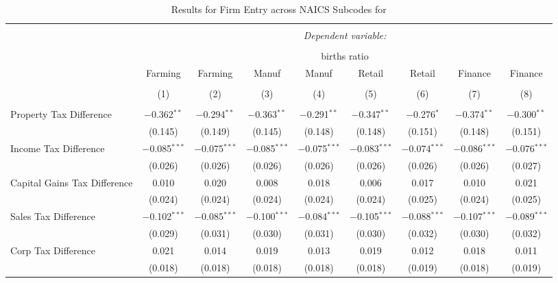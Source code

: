 
\begin{table}[!htbp] \centering 
  \caption{Results for Firm Entry across NAICS Subcodes for } 
  \label{naics} 
\small 
\begin{tabular}{@{\extracolsep{5pt}}lcccccccc} 
\\[-1.8ex]\hline 
\hline \\[-1.8ex] 
 & \multicolumn{8}{c}{\textit{Dependent variable:}} \\ 
\cline{2-9} 
\\[-1.8ex] & \multicolumn{8}{c}{births ratio} \\ 
 & Farming & Farming & Manuf & Manuf & Retail & Retail & Finance & Finance \\ 
\\[-1.8ex] & (1) & (2) & (3) & (4) & (5) & (6) & (7) & (8)\\ 
\hline \\[-1.8ex] 
 Property Tax Difference & $-$0.362$^{**}$ & $-$0.294$^{**}$ & $-$0.363$^{**}$ & $-$0.291$^{**}$ & $-$0.347$^{**}$ & $-$0.276$^{*}$ & $-$0.374$^{**}$ & $-$0.300$^{**}$ \\ 
  & (0.145) & (0.149) & (0.145) & (0.148) & (0.148) & (0.151) & (0.148) & (0.151) \\ 
  Income Tax Difference & $-$0.085$^{***}$ & $-$0.075$^{***}$ & $-$0.085$^{***}$ & $-$0.075$^{***}$ & $-$0.083$^{***}$ & $-$0.074$^{***}$ & $-$0.086$^{***}$ & $-$0.076$^{***}$ \\ 
  & (0.026) & (0.026) & (0.026) & (0.026) & (0.026) & (0.026) & (0.026) & (0.027) \\ 
  Capital Gains Tax Difference & 0.010 & 0.020 & 0.008 & 0.018 & 0.006 & 0.017 & 0.010 & 0.021 \\ 
  & (0.024) & (0.024) & (0.024) & (0.024) & (0.024) & (0.025) & (0.024) & (0.025) \\ 
  Sales Tax Difference & $-$0.102$^{***}$ & $-$0.085$^{***}$ & $-$0.100$^{***}$ & $-$0.084$^{***}$ & $-$0.105$^{***}$ & $-$0.088$^{***}$ & $-$0.107$^{***}$ & $-$0.089$^{***}$ \\ 
  & (0.029) & (0.031) & (0.030) & (0.031) & (0.030) & (0.032) & (0.030) & (0.032) \\ 
  Corp Tax Difference & 0.021 & 0.014 & 0.019 & 0.013 & 0.019 & 0.012 & 0.018 & 0.011 \\ 
  & (0.018) & (0.018) & (0.018) & (0.018) & (0.018) & (0.019) & (0.018) & (0.019) \\ 

\end{tabular}
\end{table}

